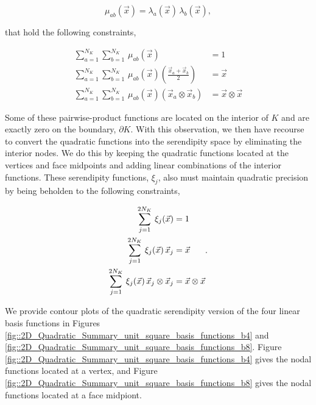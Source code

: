 \documentclass[11pt]{article}
\begin{document}
\begin{equation}
\label{eq::quad_funcs}
\mu_{a b} (\vec{x}) = \lambda_{a} (\vec{x}) \, \lambda_{ b} (\vec{x}) ,
\end{equation}

\noindent that hold the following constraints,

\begin{equation}
\label{eq::quad_constraints}
\begin{aligned}
\sum_{a=1}^{N_K} \sum_{b=1}^{N_K} \, \mu_{a b} (\vec{x}) &= 1 \\
\sum_{a=1}^{N_K} \sum_{b=1}^{N_K} \, \mu_{a b} (\vec{x}) \left( \frac{\vec{x}_{a} + \vec{x}_{b}}{2} \right)&= \vec{x} \\
\sum_{a=1}^{N_K} \sum_{b=1}^{N_K} \, \mu_{a b} (\vec{x}) \left(  \vec{x}_{a} \otimes \vec{x}_{b} \right)&= \vec{x} \otimes \vec{x}
\end{aligned}
\end{equation}

\noindent Some of these pairwise-product functions are located on the interior of $K$ and are exactly zero on the boundary, $\partial K$. With this observation, we then have recourse to convert the quadratic functions into the serendipity space by eliminating the interior nodes. We do this by keeping the quadratic functions located at the vertices and face midpoints and adding linear combinations of the interior functions. These serendipity functions, $\xi_j$, also must maintain quadratic precision by being beholden to the following constraints,

\begin{equation}
\label{eq::serendipity_constraints}
\centering
\begin{aligned}
\sum_{j=1}^{ 2N_K}  \, \xi_{j} (\vec{x}) &= 1 \\
\sum_{j=1}^{ 2N_K}  \, \xi_{j} (\vec{x}) \, \vec{x}_{j} &= \vec{x} \\
\sum_{j=1}^{2 N_K}  \, \xi_{j} (\vec{x}) \, \vec{x}_j \otimes \vec{x}_j &= \vec{x} \otimes \vec{x}
\end{aligned} .
\end{equation}

\noindent We provide contour plots of the quadratic serendipity version of the four linear basis functions in Figures \ref{fig::2D_Quadratic_Summary_unit_square_basis_functions_b4} and \ref{fig::2D_Quadratic_Summary_unit_square_basis_functions_b8}. Figure \ref{fig::2D_Quadratic_Summary_unit_square_basis_functions_b4} gives the nodal functions located at a vertex, and Figure \ref{fig::2D_Quadratic_Summary_unit_square_basis_functions_b8} gives the nodal functions located at a face midpiont.
\end{document}
